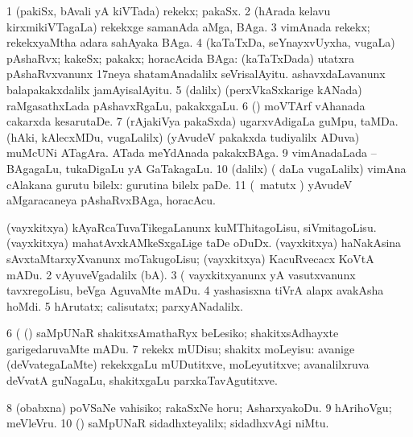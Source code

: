 \bentry
{} 
\gl{\nA}
\expl{}
\bmng
\bnum
\num{1} (pakiSx, bAvali yA kiVTada) rekekx; pakaSx. 
\num{2} (hArada kelavu kirxmikiVTagaLa) rekekxge samanAda aMga, BAga. 
\num{3} vimAnada rekekx; rekekxyaMtha adara sahAyaka BAga. 
\num{4} (kaTaTxDa, seYnayxvUyxha, \mo vugaLa) pAshaRvx; kakeSx; pakakx; horacAcida BAga:  (kaTaTxDada) utatxra pAshaRvxvanunx 17neya shatamAnadalilx seVrisalAyitu.  ashavxdaLavanunx balapakakxdalilx jamAyisalAyitu. 
\num{5} (\bava dalilx) (perxVkaSxkarige kANada) raMgasathxLada pAshavxRgaLu, pakakxgaLu. 
\num{6} (\birx) moVTArf vAhanada cakarxda kesarutaDe. 
\num{7} (rAjakiVya pakaSxda) ugarxvAdigaLa guMpu, taMDa. 
 (hAki, kAlecxMDu, \mo vugaLalilx) 
\banum
{} (yAvudeV pakakxda tudiyalilx ADuva) muMcUNi ATagAra. 
 ATada meYdAnada pakakxBAga. 
\eanum
\numie
\num{9} vimAnadaLada -- BAgagaLu, tukaDigaLu yA GaTakagaLu. 
\num{10} (\bava dalilx) ( daLa \mo vugaLalilx) vimAna cAlakana gurutu bilelx:  gurutina bilelx paDe. 
\num{11} (\aMrashA\ matutx \savi) yAvudeV aMgaracaneya pAshaRvxBAga, horacAcu. 
\enum
\emng

\noindent
\gl{\pagu}
\bmng
\bnum
{}  
\banum
{} (vayxkitxya) kAyaRcaTuvaTikegaLanunx kuMThitagoLisu, siVmitagoLisu. 
 (vayxkitxya) mahatAvxkAMkeSxgaLige taDe oDuDx. 
 (vayxkitxya) haNakAsina sAvxtaMtarxyXvanunx moTakugoLisu; (vayxkitxya) KacuRvecacx KoVtA mADu. 
\eanum
\numie
\num{2}  vAyuveVgadalilx (bA). 
\num{3}  (  vayxkitxyanunx yA vasutxvanunx tavxregoLisu, beVga AguvaMte mADu. 
\num{4}  yashasisxna tiVrA alapx avakAsha hoMdi. 
\num{5}  hArutatx; calisutatx; parxyANadalilx. 
\num{6}  (  (\rUpa) saMpUNaR shakitxsAmathaRyx beLesiko; shakitxsAdhayxte garigedaruvaMte mADu. 
\num{7}  rekekx mUDisu; shakitx moLeyisu:  avanige (deVvategaLaMte) rekekxgaLu mUDutitxve, moLeyutitxve; avanalilxruva deVvatA guNagaLu, shakitxgaLu parxkaTavAgutitxve. 
\num{8}  (obabxna) poVSaNe vahisiko; rakaSxNe horu; AsharxyakoDu. 
\num{9}  hArihoVgu; meVleVru. 
\num{10}  (\rUpa) saMpUNaR sidadhxteyalilx; sidadhxvAgi niMtu. 
\enum
\emng
\eentry

